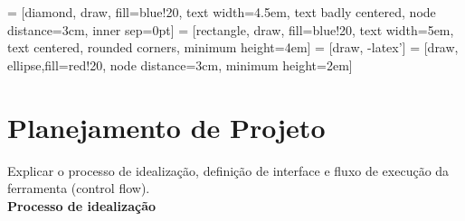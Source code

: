  = [diamond, draw, fill=blue!20, 
    text width=4.5em, text badly centered, node distance=3cm, inner sep=0pt]
 = [rectangle, draw, fill=blue!20, 
    text width=5em, text centered, rounded corners, minimum height=4em]
 = [draw, -latex']
 = [draw, ellipse,fill=red!20, node distance=3cm,
    minimum height=2em]

\section{Planejamento de Projeto}

Explicar o processo de idealização, definição de interface e fluxo de execução da ferramenta (control flow).  \\ 

\textbf{Processo de idealização} \\

